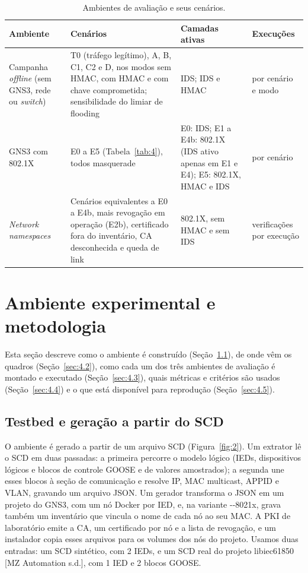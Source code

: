 \documentclass[12pt]{article}
\newcommand{\cit}[2]{[#1]\nocite{#2}}
\begin{document}
\begin{table}[!t]
\centering
\caption{Ambientes de avaliação e seus cenários.}\label{tab:7}
\footnotesize
\renewcommand{\arraystretch}{1.25}
\begin{tabularx}{\linewidth}{|>{\hsize=0.738\hsize\raggedright\arraybackslash}X|>{\hsize=1.398\hsize\raggedright\arraybackslash}X|>{\hsize=1.165\hsize\raggedright\arraybackslash}X|>{\hsize=0.700\hsize\raggedright\arraybackslash}X|}
\hline
\textbf{Ambiente} & \textbf{Cenários} & \textbf{Camadas ativas} & \textbf{Execuções} \\ \hline
Campanha \emph{offline} (sem GNS3, rede ou \emph{switch}) & T0 (tráfego legítimo), A, B, C1, C2 e D, nos modos sem HMAC, com HMAC e com chave comprometida; sensibilidade do limiar de flooding & IDS; IDS e HMAC & 100 por cenário e modo \\ \hline
GNS3 com 802.1X & E0 a E5 (Tabela~\ref{tab:4}), todos masquerade & E0: IDS; E1 a E4b: 802.1X (IDS ativo apenas em E1 e E4); E5: 802.1X, HMAC e IDS & 1 por cenário \\ \hline
\emph{Network namespaces} & Cenários equivalentes a E0 a E4b, mais revogação em operação (E2b), certificado fora do inventário, CA desconhecida e queda de link & 802.1X, sem HMAC e sem IDS & 30 verificações por execução \\ \hline
\end{tabularx}
\end{table}

\section{Ambiente experimental e metodologia}\label{sec:4}

Esta seção descreve como o ambiente é construído (Seção~\ref{sec:4.1}), de onde vêm os quadros (Seção~\ref{sec:4.2}), como cada um dos três ambientes de avaliação é montado e executado (Seção~\ref{sec:4.3}), quais métricas e critérios são usados (Seção~\ref{sec:4.4}) e o que está disponível para reprodução (Seção~\ref{sec:4.5}).

\subsection{Testbed e geração a partir do SCD}\label{sec:4.1}

O ambiente é gerado a partir de um arquivo SCD (Figura~\ref{fig:2}). Um extrator lê o SCD em duas passadas: a primeira percorre o modelo lógico (IEDs, dispositivos lógicos e blocos de controle GOOSE e de valores amostrados); a segunda une esses blocos à seção de comunicação e resolve IP, MAC multicast, APPID e VLAN, gravando um arquivo JSON. Um gerador transforma o JSON em um projeto do GNS3, com um nó Docker por IED, e, na variante -{}-8021x, grava também um inventário que vincula o nome de cada nó ao seu MAC. A PKI de laboratório emite a CA, um certificado por nó e a lista de revogação, e um instalador copia esses arquivos para os volumes dos nós do projeto. Usamos duas entradas: um SCD sintético, com 2 IEDs, e um SCD real do projeto libiec61850 \cit{MZ Automation s.d.}{libiec61850}, com 1 IED e 2 blocos GOOSE.
\end{document}
